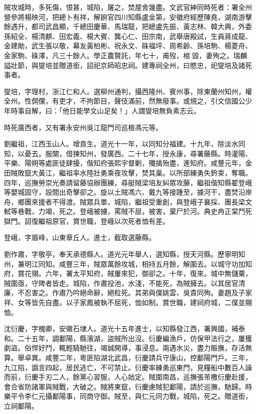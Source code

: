\begin{pinyinscope}
賊攻城時，多死傷，恨甚，城陷，屠之，焚屋舍幾盡。文武官紳同時死者：署全州營參將楊映河，把總卜有祥，解餉官四川知縣盧金第，安徽府經歷陳堯，湖南游擊餘遇升，都司武昌顯，千總田慶華、馬瑞龍，把總盧先振、黃志林、韓大興，外委孫紹全、楊清麒、田宏義、楊大賓、龔心仁、田宗南，武舉唐殿試，生員蔣成龍、金建勛，武生張以敬，幕友黃柏彬、祝永文、硃福坪、周希齡、孫培駒、楊菱舟、金家駒、硃澤，凡三十餘人。學正農賢託，年七十，甫歿，棺毀，妻殉之。瑞麟謚壯節，與燮培並贈道銜，詔祀京師昭忠祠。建專祠全州，曰愍忠，祀燮培及諸死事者。

燮培，字理村，浙江仁和人。選柳州通判，攝西隆州、賓州事，除東蘭州知州，權全州。性倜儻，有吏才，不拘節目，聲伎滿前，然無廢事。或規之，引文信國公少年時事自解，曰：「他日能學文山足矣！」人謂燮培無負素志云。

時死廣西者，又有署永安州吳江龍門司巡檢馮元等。

劉繼祖，江西玉山人。增貢生。道光十一年，以同知分福建。十九年，除淡水同知，以憂去。服闋，借揀知州，發廣西。二十七年，授永康，尋署藤縣。時灌陽、平樂、陽朔等處匪徒肆擾，偕知府張熙宇督剿，殲擒殆盡，進知府。咸豐元年，金田賊敗竄大黃江，繼祖率水陸壯勇乘夜攻擊，焚其巢。以所部練勇失鈐束，奪職。四年，巡撫勞崇光奏請留藤協辦團練，尋艇賊梁培友糾眾攻藤，繼祖偕知縣翟登峨等嬰城固守，設間出奇擊卻之。旋以土賊馮六、戴九等接踵至，據河干，盡焚沿岸舟，鄉團來援者不得渡。賊眾兵單，城陷，繼祖受重創，與登峨子襄採、團長梁文軾等巷戰，力竭，死之。登峨被擄，罵賊不屈，被害，棄尸於河。典史冉正棠鬥死獄門。詔復繼祖原官，賞世職，登峨以次死者恤有差。

登峨，字眉峰，山東章丘人。進士，截取選藤縣。

劉作肅，字敬亭，奉天承德縣人。道光元年舉人，選知縣，授天河縣。歷寧明知州，兼明江同知。咸豐三年，賊眾萬餘攻城，相持五月餘，解圍去。以城守功加知府，賞花翎。六年，署太平知府，賊屢來犯，御卻之。十年，復來。城中無儲粟，賊圍亟，守陴者皆走。城陷，作肅投池，水淺，不能死，為賊擁去。以其居官清廉，不忍害之。作肅乃吟絕命辭，絕粒死。其弟與僕姚雲、吳貴同殉。妻趙及子家祥、女等皆先自盡。以子家鳳被執不屈死，恤如制。賞世職，建祠府城，二僕並賜恤。

沈衍慶，字槐卿，安徽石埭人。道光十五年進士，以知縣發江西，署興國，補泰和。二十五年，調鄱陽，縣濱湖，盜賊所出沒。衍慶編漁戶，仿保甲法行之，屢獲劇盜。俗悍好鬥，輒輕騎馳往，竭誠開導，事浸息。兩遇水災，盡力賑撫，存活無算。舉卓異。咸豐二年，粵匪陷湖北武昌，衍慶請兵守康山，控鄱陽門戶。三年，九江陷，譌言四起，居民逃亡，不可禁止。衍慶率練勇巡東門，見糧船中數百人譟而前，衍慶手刃二人，餘黨心習服，人心始定。賊圍南昌，巡撫張芾檄衍慶赴援，會合省防諸軍與賊戰，大破之。賊將東竄，衍慶慮賊犯鄱陽，請於巡撫，馳歸。時樂平令李仁元攝鄱陽事，同商守御。賊至，與仁元同力戰，城陷，死之。贈道銜，立祠鄱陽。


\end{pinyinscope}
